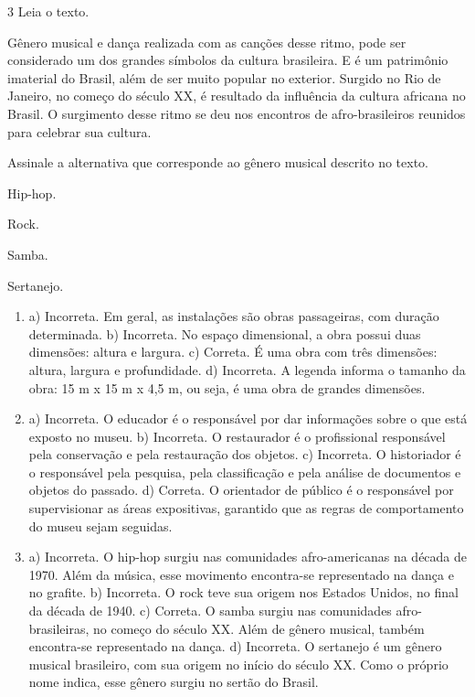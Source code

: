 \num{3}  Leia o texto.

Gênero musical e dança realizada com as canções desse ritmo, pode ser considerado um dos
grandes símbolos da cultura brasileira. E é um patrimônio imaterial do Brasil, além de
ser muito popular no exterior. Surgido no Rio de Janeiro, no começo do século XX, é
resultado da influência da cultura africana no Brasil. O surgimento desse ritmo se deu
nos encontros de afro-brasileiros reunidos para celebrar sua cultura.

Assinale a alternativa que corresponde ao gênero musical descrito no texto.

\begin{minipage}{.5\textwidth}
\begin{escolha}
\item
  Hip-hop.
\item
  Rock.
\item
  Samba.
\item
  Sertanejo.
\end{escolha}
\end{minipage}


\begin{enumerate}
\item
a) Incorreta. Em geral, as instalações são obras passageiras, com
duração determinada.
b) Incorreta. No espaço dimensional, a obra possui duas dimensões: altura
e largura.
c) Correta. É uma obra com três dimensões: altura, largura e
profundidade.
d) Incorreta. A legenda informa o tamanho da obra: 15 m x 15 m x 4,5 m, ou
seja, é uma obra de grandes dimensões.

\item
a)  Incorreta. O educador é o responsável por dar informações sobre o que
  está exposto no museu.
b) Incorreta. O restaurador é o profissional responsável pela conservação
  e pela restauração dos objetos.
c) Incorreta. O historiador é o responsável pela pesquisa, pela classificação
  e pela análise de documentos e objetos do passado.
d) Correta. O orientador de público é o responsável por supervisionar as
  áreas expositivas, garantido que as regras de comportamento do museu
  sejam seguidas.

\item
a)  Incorreta. O hip-hop surgiu nas comunidades afro-americanas na década
  de 1970. Além da música, esse movimento encontra-se representado na
  dança e no grafite.
b) Incorreta. O rock teve sua origem nos Estados Unidos, no final da
  década de 1940.
c) Correta. O samba surgiu nas comunidades afro-brasileiras, no começo do
  século XX. Além de gênero musical, também encontra-se representado na
  dança.
d) Incorreta. O sertanejo é um gênero musical brasileiro, com sua origem
  no início do século XX. Como o próprio nome indica, esse gênero surgiu
  no sertão do Brasil.
\end{enumerate}

